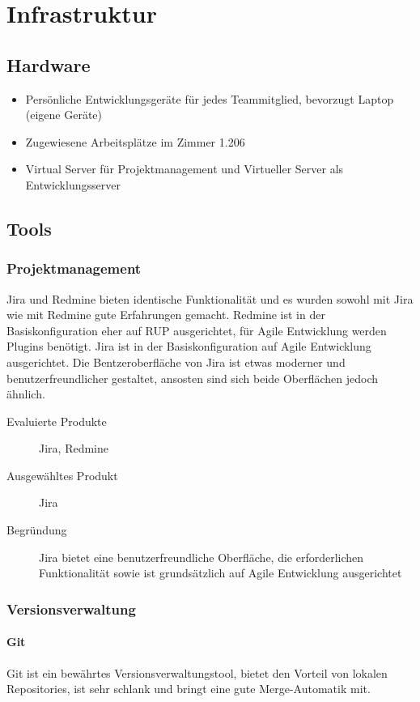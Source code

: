 \chapter{Infrastruktur}
	\section{Hardware}
		\begin{itemize}
			\setlength{\itemsep}{-\parsep}
			\item Persönliche Entwicklungsgeräte für jedes Teammitglied, bevorzugt Laptop (eigene Geräte)
			\item Zugewiesene Arbeitsplätze im Zimmer 1.206
			\item Virtual Server für Projektmanagement und Virtueller Server als Entwicklungsserver
		\end{itemize}

		
	\section{Tools}
		\subsection{Projektmanagement}	
			Jira und Redmine bieten identische Funktionalität und es wurden sowohl mit Jira wie mit Redmine gute Erfahrungen gemacht. Redmine ist in der Basiskonfiguration eher auf RUP ausgerichtet, für Agile Entwicklung werden Plugins benötigt. Jira ist in der Basiskonfiguration auf Agile Entwicklung ausgerichtet. Die Bentzeroberfläche von Jira ist etwas moderner und benutzerfreundlicher gestaltet, ansosten sind sich beide Oberflächen jedoch ähnlich.
		
			\begin{description}
				\item[Evaluierte Produkte] Jira, Redmine
				\item[Ausgewähltes Produkt] Jira
				\item[Begründung] Jira bietet eine benutzerfreundliche Oberfläche, die erforderlichen Funktionalität sowie ist grundsätzlich auf Agile Entwicklung ausgerichtet
			\end{description}


		\subsection{Versionsverwaltung}
			\subsubsection{Git}
				Git ist ein bewährtes Versionsverwaltungstool, bietet den Vorteil von lokalen Repositories, ist sehr schlank und bringt eine gute Merge-Automatik mit.

